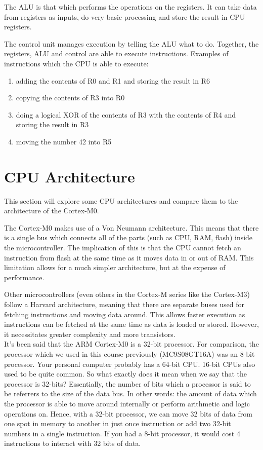 The ALU is that which performs the operations on the registers. It can take data from registers as inputs, do very basic processing and store the result in CPU registers. 

The control unit manages execution by telling the ALU what to do. Together, the registers, ALU and control are able to execute instructions. 
Examples of instructions which the CPU is able to execute:
\begin{enumerate}
  \item adding the contents of R0 and R1 and storing the result in R6
  \item copying the contents of R3 into R0
  \item doing a logical XOR of the contents of R3 with the contents of R4 and storing the result in R3
  \item moving the number 42 into R5
\end{enumerate}


\section{CPU Architecture}
This section will explore some CPU architectures and compare them to the architecture of the Cortex-M0.

The Cortex-M0 makes use of a Von Neumann architecture. This means that there is a single bus which connects all of the parts (such as CPU, RAM, flash)  inside the microcontroller. The implication of this is that the CPU cannot fetch an instruction from flash at the same time as it moves data in or out of RAM. This limitation allows for a much simpler architecture, but at the expense of performance. 

Other microcontrollers (even others in the Cortex-M series like the Cortex-M3) follow a Harvard architecture, meaning that there are separate buses used for fetching instructions and moving data around. This allows faster execution as instructions can be fetched at the same time as data is loaded or stored. However, it necessitates greater complexity and more transistors. \\

It's been said that the ARM Cortex-M0 is a 32-bit processor. For comparison, the processor which we used in this course previously (MC9S08GT16A) was an 8-bit processor. Your personal computer probably has a 64-bit CPU. 16-bit CPUs also used to be quite common. So what exactly does it mean when we say that the processor is 32-bits? Essentially, the number of bits which a processor is said to be referrers to the size of the data bus. In other words: the amount of data which the processor is able to move around internally or perform arithmetic and logic operations on. Hence, with a 32-bit processor, we can move 32 bits of data from one spot in memory to another in just once instruction or add two 32-bit numbers in a single instruction. If you had a 8-bit processor, it would cost 4 instructions to interact with 32 bits of data.

